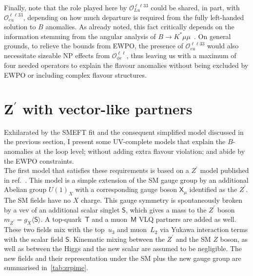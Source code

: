 Finally, note that the role played here by $\mathcal{O}_{Lu}^{\ell \ell 3 3}$ could be shared, in part, with $\mathcal{O}_{eu}^{\ell \ell 3 3}$, depending on how much departure is required from the fully left-handed solution to $B$ anomalies. As already noted, this fact critically depends on the information stemming from the angular analysis of $B \to K^{*} \mu \mu$~\cite{Ciuchini:2019usw}. On general grounds, to relieve the bounds from EWPO, the presence of $\mathcal{O}_{eu}^{\ell \ell 3 3}$ would also necessitate sizeable NP effects from $\mathcal{O}_{\phi e}^{\ell \ell}$, thus leaving us with a maximum of four needed operators to explain the flavour anomalies without being excluded by EWPO or including complex flavour structures.
\section{\texorpdfstring{Z$^{\prime}$}{Z'} with vector-like partners}
\label{sec:mod_Zprime}
Exhilarated by the SMEFT fit and the consequent simplified model discussed in the previous section, I present some UV-complete models that explain the $B$-anomalies at the loop level; without adding extra flavour violation; and abide by the EWPO constraints.  \\  The first model that satisfies these requirements is based on a $Z^\prime$ model published in ref.~\cite{Kamenik:2017tnu}.  This model is a simple extension of the SM gauge group by an additional Abelian group $U(1)_X$ with a corresponding gauge boson $\mathsf{X}_{\mu}$ identified as the $Z^\prime$. The SM fields have no $X$ charge. This gauge symmetry is spontaneously broken by a vev of an additional scalar singlet $\mathsf{S}$, which gives a mass to the $Z^\prime$ boson~$m_{Z^{\prime}} = g_{X} \langle \mathsf{S} \rangle $. A top-quark~$\mathsf{T}$ and a muon~$\mathsf{M}$ VLQ partners are added as well. These two fields mix with the top~$u_3$ and muon~$L_2$ via Yukawa interaction terms with the scalar field $\mathsf S$. Kinematic mixing between the $Z^\prime$ and the SM $Z$ boson, as well as between the Higgs and the new scalar are assumed to be negligible. The new fields and their representation under the SM plus the new gauge group are summarised in~\autoref{tab:zrpime}. \\
